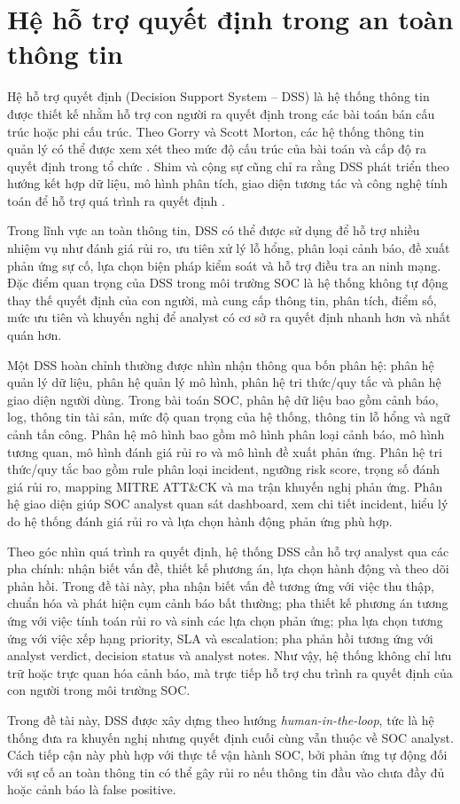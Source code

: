 \documentclass[a4paper,12pt,oneside]{book}
\begin{document}
\section{Hệ hỗ trợ quyết định trong an toàn thông tin}
{\fontsize{13pt}{15.6pt}\selectfont

Hệ hỗ trợ quyết định (Decision Support System -- DSS) là hệ thống thông tin được thiết kế nhằm hỗ trợ con người ra quyết định trong các bài toán bán cấu trúc hoặc phi cấu trúc. Theo Gorry và Scott Morton, các hệ thống thông tin quản lý có thể được xem xét theo mức độ cấu trúc của bài toán và cấp độ ra quyết định trong tổ chức \cite{gorry1971framework}. Shim và cộng sự cũng chỉ ra rằng DSS phát triển theo hướng kết hợp dữ liệu, mô hình phân tích, giao diện tương tác và công nghệ tính toán để hỗ trợ quá trình ra quyết định \cite{shim2002dss}.

\noindent Trong lĩnh vực an toàn thông tin, DSS có thể được sử dụng để hỗ trợ nhiều nhiệm vụ như đánh giá rủi ro, ưu tiên xử lý lỗ hổng, phân loại cảnh báo, đề xuất phản ứng sự cố, lựa chọn biện pháp kiểm soát và hỗ trợ điều tra an ninh mạng. Đặc điểm quan trọng của DSS trong môi trường SOC là hệ thống không tự động thay thế quyết định của con người, mà cung cấp thông tin, phân tích, điểm số, mức ưu tiên và khuyến nghị để analyst có cơ sở ra quyết định nhanh hơn và nhất quán hơn.

\noindent Một DSS hoàn chỉnh thường được nhìn nhận thông qua bốn phân hệ: phân hệ quản lý dữ liệu, phân hệ quản lý mô hình, phân hệ tri thức/quy tắc và phân hệ giao diện người dùng. Trong bài toán SOC, phân hệ dữ liệu bao gồm cảnh báo, log, thông tin tài sản, mức độ quan trọng của hệ thống, thông tin lỗ hổng và ngữ cảnh tấn công. Phân hệ mô hình bao gồm mô hình phân loại cảnh báo, mô hình tương quan, mô hình đánh giá rủi ro và mô hình đề xuất phản ứng. Phân hệ tri thức/quy tắc bao gồm rule phân loại incident, ngưỡng risk score, trọng số đánh giá rủi ro, mapping MITRE ATT\&CK và ma trận khuyến nghị phản ứng. Phân hệ giao diện giúp SOC analyst quan sát dashboard, xem chi tiết incident, hiểu lý do hệ thống đánh giá rủi ro và lựa chọn hành động phản ứng phù hợp.

\noindent Theo góc nhìn quá trình ra quyết định, hệ thống DSS cần hỗ trợ analyst qua các pha chính: nhận biết vấn đề, thiết kế phương án, lựa chọn hành động và theo dõi phản hồi. Trong đề tài này, pha nhận biết vấn đề tương ứng với việc thu thập, chuẩn hóa và phát hiện cụm cảnh báo bất thường; pha thiết kế phương án tương ứng với việc tính toán rủi ro và sinh các lựa chọn phản ứng; pha lựa chọn tương ứng với việc xếp hạng priority, SLA và escalation; pha phản hồi tương ứng với analyst verdict, decision status và analyst notes. Như vậy, hệ thống không chỉ lưu trữ hoặc trực quan hóa cảnh báo, mà trực tiếp hỗ trợ chu trình ra quyết định của con người trong môi trường SOC.

\noindent Trong đề tài này, DSS được xây dựng theo hướng \textit{human-in-the-loop}, tức là hệ thống đưa ra khuyến nghị nhưng quyết định cuối cùng vẫn thuộc về SOC analyst. Cách tiếp cận này phù hợp với thực tế vận hành SOC, bởi phản ứng tự động đối với sự cố an toàn thông tin có thể gây rủi ro nếu thông tin đầu vào chưa đầy đủ hoặc cảnh báo là false positive.

}
\end{document}
